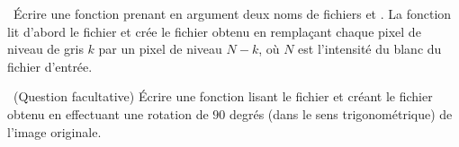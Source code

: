 \question\ Écrire une fonction  prenant en argument
   deux noms de fichiers  et . La fonction lit d'abord le fichier
    et crée le fichier  obtenu en remplaçant chaque pixel
   de niveau de gris $k$ par un pixel de niveau $N-k$, où $N$ est l'intensité du blanc du fichier d'entrée.
   
\question\ (Question facultative) Écrire une fonction 
   lisant le fichier 
    et créant le fichier  obtenu en effectuant une rotation
   de $90$ degrés (dans le sens trigonométrique) de l'image originale.
